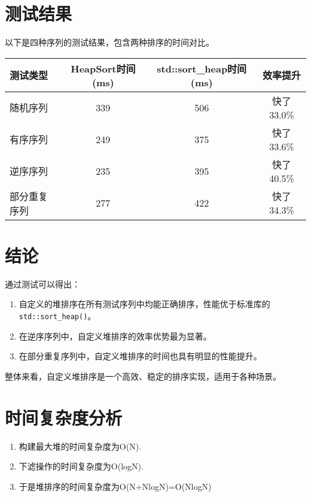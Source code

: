 \documentclass[UTF8]{ctexart}
\begin{document}
\section{测试结果}
以下是四种序列的测试结果，包含两种排序的时间对比。

\begin{longtable}{|l|c|c|c|}
\hline
\textbf{测试类型} & \textbf{HeapSort时间(ms)} & \textbf{std::sort\_heap时间(ms)} & \textbf{效率提升} \\ \hline
随机序列        & 339                      & 506                              & 快了33.0\%        \\ \hline
有序序列        & 249                      & 375                              & 快了33.6\%        \\ \hline
逆序序列        & 235                      & 395                              & 快了40.5\%        \\ \hline
部分重复序列    & 277                      & 422                              & 快了34.3\%        \\ \hline
\end{longtable}

\section{结论}
通过测试可以得出：
\begin{enumerate}
    \item 自定义的堆排序在所有测试序列中均能正确排序，性能优于标准库的\texttt{std::sort\_heap()}。
    \item 在逆序序列中，自定义堆排序的效率优势最为显著。
    \item 在部分重复序列中，自定义堆排序的时间也具有明显的性能提升。
    
\end{enumerate}

整体来看，自定义堆排序是一个高效、稳定的排序实现，适用于各种场景。
\section{时间复杂度分析}

\begin{enumerate}
    \item 构建最大堆的时间复杂度为O(N).
    \item 下滤操作的时间复杂度为O(logN).
    \item 于是堆排序的时间复杂度为O(N+NlogN)=O(NlogN)
    
\end{enumerate}
\end{document}
